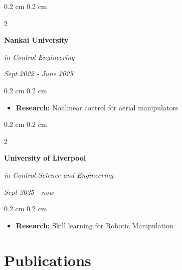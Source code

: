 \documentclass[10pt, letterpaper]{article}
\newenvironment{highlights}{
  \begin{itemize}[
    topsep=0.10 cm,
    parsep=0.10 cm,
    partopsep=0pt,
    itemsep=0pt,
    leftmargin=0.4 cm + 10pt
  ]
}{
    \end{itemize}
} %
\newenvironment{onecolentry}{
    \begin{adjustwidth}{
        0.2 cm
    }{
        0.2 cm
    }
}{
    \end{adjustwidth}
} %
\newenvironment{twocolentry}[2][]{
    \onecolentry
    \def\secondColumn{#2}
    \setcolumnwidth{\fill, 4.0 cm}
    \begin{paracol}{2}
}{
    \switchcolumn \raggedleft \secondColumn
    \end{paracol}
    \endonecolentry
} %
\begin{document}
  \begin{twocolentry}{\textit{Sept 2022 - June 2025}}
    \textbf{Nankai University}

     \textit{in Control Engineering}
  \end{twocolentry}
  
  \vspace{0.1cm}
  
  \begin{onecolentry}
    \begin{highlights}
      \item \textbf{Research:} Nonlinear control for aerial manipulators
    \end{highlights}
  \end{onecolentry}

  \vspace{0.1cm}

  \begin{twocolentry}{\textit{Sept 2025 - now}}
    \textbf{University of Liverpool}

     \textit{in Control Science and Engineering}
  \end{twocolentry}
  
  \vspace{0.1cm}
  
  \begin{onecolentry}
    \begin{highlights}
      \item \textbf{Research:} Skill learning for Robotic Manipulation
    \end{highlights}
  \end{onecolentry}

\section{Publications}


\end{document}
